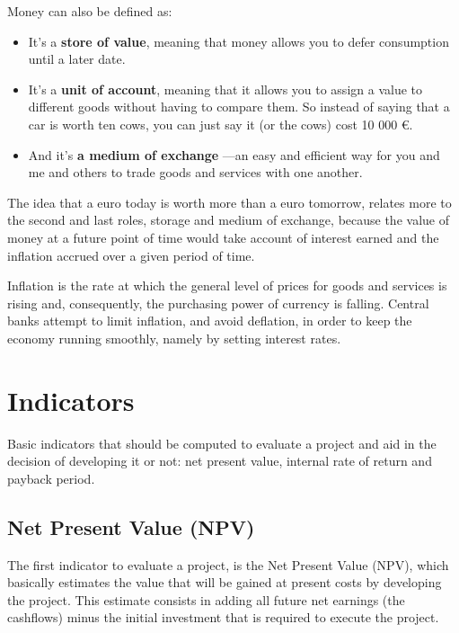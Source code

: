 \documentclass[]{book}
\newcommand{\euro}{€}
\providecommand{\tightlist}{%
  \setlength{\itemsep}{0pt}\setlength{\parskip}{0pt}}
\theoremstyle{definition}
\theoremstyle{definition}
\theoremstyle{definition}
\theoremstyle{remark}
\begin{document}
Money can also be defined as:

\begin{itemize}
\tightlist
\item
  It's a \textbf{store of value}, meaning that money allows you to defer
  consumption until a later date.
\item
  It's a \textbf{unit of account}, meaning that it allows you to assign
  a value to different goods without having to compare them. So instead
  of saying that a car is worth ten cows, you can just say it (or the
  cows) cost 10 000 \euro{}.
\item
  And it's \textbf{a medium of exchange} ---an easy and efficient way
  for you and me and others to trade goods and services with one
  another.
\end{itemize}

The idea that a euro today is worth more than a euro tomorrow, relates
more to the second and last roles, storage and medium of exchange,
because the value of money at a future point of time would take account
of interest earned and the inflation accrued over a given period of
time.

Inflation is the rate at which the general level of prices for goods and
services is rising and, consequently, the purchasing power of currency
is falling. Central banks attempt to limit inflation, and avoid
deflation, in order to keep the economy running smoothly, namely by
setting interest rates.

\section{Indicators}\label{indicators}

Basic indicators that should be computed to evaluate a project and aid
in the decision of developing it or not: net present value, internal
rate of return and payback period.

\subsection{Net Present Value (NPV)}\label{net-present-value-npv}

The first indicator to evaluate a project, is the Net Present Value
(NPV), which basically estimates the value that will be gained at
present costs by developing the project. This estimate consists in
adding all future net earnings (the cashflows) minus the initial
investment that is required to execute the project.
\end{document}

